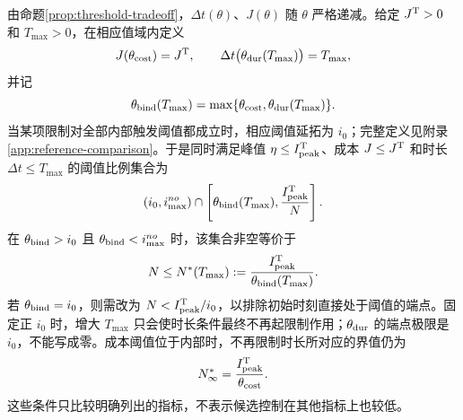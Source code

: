 \documentclass[lang=cn,a4paper,newtx]{elegantpaper}
\numberwithin{equation}{section}
\theoremstyle{plain}
\begin{document}
由命题\ref{prop:threshold-tradeoff}，$\Delta t(\theta)$、$J(\theta)$ 随 $\theta$ 严格递减。给定 $J^{\rm T}>0$ 和 $T_{\max}>0$，在相应值域内定义
\begin{equation}
J(\theta_{\rm cost})=J^{\rm T},\qquad
\Delta t\bigl(\theta_{\rm dur}(T_{\max})\bigr)=T_{\max},
\label{eq:dom:thetadefs}
\end{equation}
并记
\begin{equation}
\theta_{\rm bind}(T_{\max})
=\max\{\theta_{\rm cost},\theta_{\rm dur}(T_{\max})\}.
\label{eq:dom:theta-bind}
\end{equation}
当某项限制对全部内部触发阈值都成立时，相应阈值延拓为 $i_0$；完整定义见附录\ref{app:reference-comparison}。于是同时满足峰值 $\eta\le I^{\rm T}_{\rm peak}$、成本 $J\le J^{\rm T}$ 和时长 $\Delta t\le T_{\max}$ 的阈值比例集合为
\begin{equation}
(i_0,i_{\max}^{no})\cap
\left[\theta_{\rm bind}(T_{\max}),\frac{I^{\rm T}_{\rm peak}}N\right].
\label{eq:dom:band}
\end{equation}
在 $\theta_{\rm bind}>i_0$ 且 $\theta_{\rm bind}<i_{\max}^{no}$ 时，该集合非空等价于
\begin{equation}
N\le N^*(T_{\max}):=\frac{I^{\rm T}_{\rm peak}}{\theta_{\rm bind}(T_{\max})}.
\label{eq:dom:Nstar}
\end{equation}
若 $\theta_{\rm bind}=i_0$，则需改为 $N<I^{\rm T}_{\rm peak}/i_0$，以排除初始时刻直接处于阈值的端点。固定正 $i_0$ 时，增大 $T_{\max}$ 只会使时长条件最终不再起限制作用；$\theta_{\rm dur}$ 的端点极限是 $i_0$，不能写成零。成本阈值位于内部时，不再限制时长所对应的界值仍为
\begin{equation}
N^*_{\infty}=\frac{I^{\rm T}_{\rm peak}}{\theta_{\rm cost}}.
\label{eq:dom:Nstar-infty}
\end{equation}
这些条件只比较明确列出的指标，不表示候选控制在其他指标上也较低。
\end{document}
